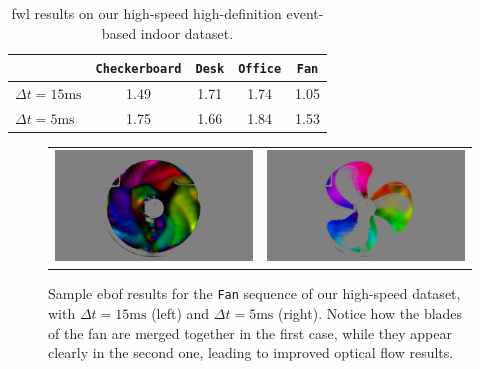 \begin{table}[ht]
  \centering
  \begin{tabular}{@{}l c c c c@{}}
    \toprule
    & \Verb|Checkerboard| & \Verb|Desk| & \Verb|Office| & \Verb|Fan| \\
    \midrule
    \(\Delta t = 15\text{ms}\) & 1.49 & 1.71 & 1.74 & 1.05 \\
    \(\Delta t = 5\text{ms}\) & 1.75 & 1.66 & 1.84 & 1.53 \\
    \bottomrule
  \end{tabular}
  \caption{\acrshort{fwl} results on our high-speed high-definition event-based indoor dataset.}\label{tab:ebof:fwl_our_hd_results}
\end{table}

\begin{figure}
  \centering
  \begin{tabular}{@{}cc@{}}
    \includegraphics[width=0.45\linewidth]{mainmatter/figures/3_optical_flow/high_speed_fan/fan_15ms.png} &
    \includegraphics[width=0.45\linewidth]{mainmatter/figures/3_optical_flow/high_speed_fan/fan_5ms.png} \\
  \end{tabular}
  \cprotect\caption{Sample \acrshort{ebof} results for the \verb|Fan| sequence of our high-speed dataset, with \(\Delta t = 15\text{ms}\) (left) and \(\Delta t = 5\text{ms}\) (right). Notice how the blades of the fan are merged together in the first case, while they appear clearly in the second one, leading to improved optical flow results.}\label{fig:ebof:high_speed_fan}
\end{figure}

